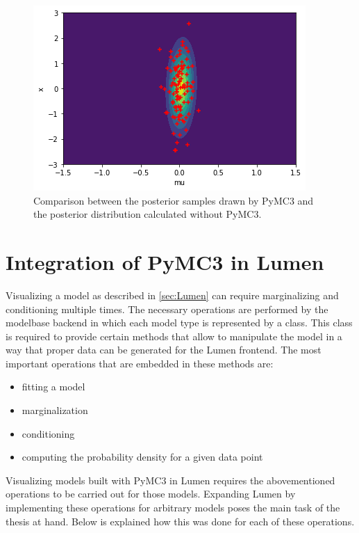 \documentclass{article}
\begin{document}
\begin{figure}
	\includegraphics[width=\textwidth]{images/PyMC3_joint_posterior_samples_simple_model_2.png}
	\caption[Comparison between the posterior samples drawn by PyMC3 and the posterior distribution calculated without PyMC3]{Comparison between the posterior samples drawn by PyMC3 and the posterior distribution calculated without PyMC3.}
	\label{fig:PyMC3_joint_posterior_samples_simple_model}
\end{figure}



\section{Integration of PyMC3 in Lumen}
\label{sec:lumen_pymc3_integration}
Visualizing a model as described in \autoref{sec:Lumen} can require marginalizing and conditioning multiple times. The necessary operations are performed by the modelbase backend in which each model type is represented by a class. This class is required to provide certain methods that allow to manipulate the model in a way that proper data can be generated for the Lumen frontend. The most important operations that are embedded in these methods are:
\begin{itemize}
	\item fitting a model
	\item marginalization
	\item conditioning
	\item computing the probability density for a given data point
\end{itemize}
Visualizing models built with PyMC3 in Lumen requires the abovementioned operations to be carried out for those models. Expanding Lumen by implementing these operations for arbitrary models poses the main task of the thesis at hand. Below is explained how this was done for each of these operations.
\end{document}
